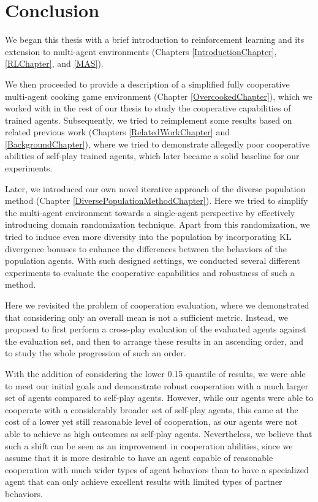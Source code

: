 \chapter*{Conclusion}

We began this thesis with a brief introduction to reinforcement learning and its extension to multi-agent environments (Chapters \ref{IntroductionChapter}, \ref{RLChapter}, and \ref{MAS}).

We then proceeded to provide a description of a simplified fully cooperative multi-agent cooking game environment (Chapter \ref{OvercookedChapter}), which we worked with in the rest of our thesis to study the cooperative capabilities of trained agents. 
Subsequently, we tried to reimplement some results based on related previous work (Chapters \ref{RelatedWorkChapter} and \ref{BackgroundChapter}), where we tried to demonstrate allegedly poor cooperative abilities of self-play trained agents, which later became a solid baseline for our experiments.

Later, we introduced our own novel iterative approach of the diverse population method (Chapter \ref{DiversePopulationMethodChapter}).
Here we tried to simplify the multi-agent environment towards a single-agent perspective by effectively introducing domain randomization technique.
Apart from this randomization, we tried to induce even more diversity into the population by incorporating KL divergence bonuses to enhance the differences between the behaviors of the population agents.
With such designed settings, we conducted several different experiments to evaluate the cooperative capabilities and robustness of such a method.

Here we revisited the problem of cooperation evaluation, where we demonstrated that considering only an overall mean is not a sufficient metric.
Instead, we proposed to first perform a cross-play evaluation of the evaluated agents against the evaluation set, and then to arrange these results in an ascending order, and to study the whole progression of such an order.

With the addition of considering the lower 0.15 quantile of results, we were able to meet our initial goals and demonstrate robust cooperation with a much larger set of agents compared to self-play agents.
However, while our agents were able to cooperate with a considerably broader set of self-play agents, this came at the cost of a lower yet still reasonable level of cooperation, as our agents were not able to achieve as high outcomes as self-play agents.
Nevertheless, we believe that such a shift can be seen as an improvement in cooperation abilities, since we assume that it is more desirable to have an agent capable of reasonable cooperation with much wider types of agent behaviors than to have a specialized agent that can only achieve excellent results with limited types of partner behaviors.


